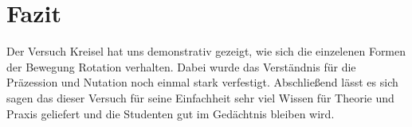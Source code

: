 

\chapter{Fazit}
\label{chap:fazit}

Der Versuch Kreisel hat uns demonstrativ gezeigt, wie sich die einzelenen Formen der Bewegung Rotation verhalten. Dabei wurde das Verständnis für die Präzession und Nutation noch einmal stark verfestigt. Abschließend lässt es sich sagen das dieser Versuch für seine Einfachheit sehr viel Wissen für Theorie und Praxis geliefert und die Studenten gut im Gedächtnis bleiben wird.